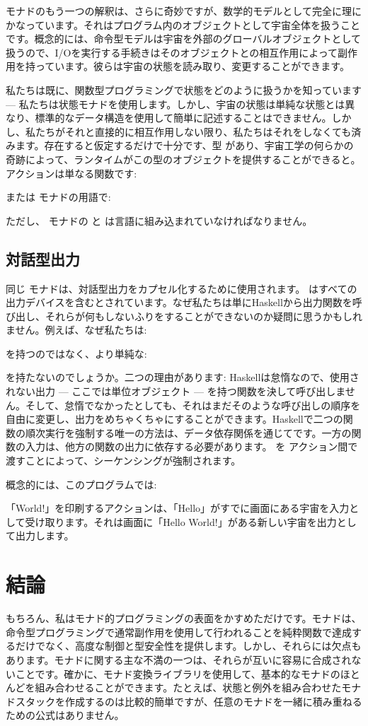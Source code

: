  モナドのもう一つの解釈は、さらに奇妙ですが、数学的モデルとして完全に理にかなっています。それはプログラム内のオブジェクトとして宇宙全体を扱うことです。概念的には、命令型モデルは宇宙を外部のグローバルオブジェクトとして扱うので、I/Oを実行する手続きはそのオブジェクトとの相互作用によって副作用を持っています。彼らは宇宙の状態を読み取り、変更することができます。

私たちは既に、関数型プログラミングで状態をどのように扱うかを知っています --- 私たちは状態モナドを使用します。しかし、宇宙の状態は単純な状態とは異なり、標準的なデータ構造を使用して簡単に記述することはできません。しかし、私たちがそれと直接的に相互作用しない限り、私たちはそれをしなくても済みます。存在すると仮定するだけで十分です、型  があり、宇宙工学の何らかの奇跡によって、ランタイムがこの型のオブジェクトを提供することができると。  アクションは単なる関数です: 

または  モナドの用語で: 

ただし、 モナドの \code{>=>} と  は言語に組み込まれていなければなりません。

\subsection{対話型出力}

同じ  モナドは、対話型出力をカプセル化するために使用されます。  はすべての出力デバイスを含むとされています。なぜ私たちは単にHaskellから出力関数を呼び出し、それらが何もしないふりをすることができないのか疑問に思うかもしれません。例えば、なぜ私たちは: 

を持つのではなく、より単純な: 

を持たないのでしょうか。二つの理由があります: Haskellは怠惰なので、使用されない出力 --- ここでは単位オブジェクト --- を持つ関数を決して呼び出しません。そして、怠惰でなかったとしても、それはまだそのような呼び出しの順序を自由に変更し、出力をめちゃくちゃにすることができます。Haskellで二つの関数の順次実行を強制する唯一の方法は、データ依存関係を通じてです。一方の関数の入力は、他方の関数の出力に依存する必要があります。 を  アクション間で渡すことによって、シーケンシングが強制されます。

概念的には、このプログラムでは: 

「World!」を印刷するアクションは、「Hello」がすでに画面にある宇宙を入力として受け取ります。それは画面に「Hello World!」がある新しい宇宙を出力として出力します。

\section{結論}

もちろん、私はモナド的プログラミングの表面をかすめただけです。モナドは、命令型プログラミングで通常副作用を使用して行われることを純粋関数で達成するだけでなく、高度な制御と型安全性を提供します。しかし、それらには欠点もあります。モナドに関する主な不満の一つは、それらが互いに容易に合成されないことです。確かに、モナド変換ライブラリを使用して、基本的なモナドのほとんどを組み合わせることができます。たとえば、状態と例外を組み合わせたモナドスタックを作成するのは比較的簡単ですが、任意のモナドを一緒に積み重ねるための公式はありません。
